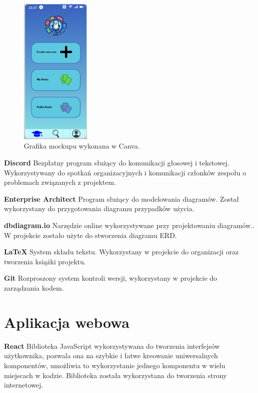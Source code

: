 \begin{figure}[H]
    \centering
    \includegraphics[width=0.3\textwidth]{chapters/chapter_7/canva}
    \caption{Grafika mockupu wykonana w Canva.}
    \label{img:canva}
\end{figure}


\textbf{Discord} Bezpłatny program służący do komunikacji głosowej i tekstowej. Wykorzystywany do spotkań organizacyjnych i komunikacji członków zespołu o problemach związanych z projektem.

\medskip

\textbf{Enterprise Architect} Program służący do modelowania diagramów. Został wykorzystany do przygotowania diagramu przypadków użycia.

\medskip

\textbf{dbdiagram.io} Narzędzie online wykorzystywane przy projektowaniu diagramów.. W projekcie zostało użyte do stworzenia diagramu ERD.

\medskip

\textbf{LaTeX} System składu tekstu. Wykorzystany w projekcie do organizacji oraz tworzenia książki projektu.

\medskip

\textbf{Git} Rozproszony system kontroli wersji, wykorzystany w projekcie do zarządzania kodem.

\section{Aplikacja webowa}

\textbf{React} Biblioteka JavaScript wykorzystywana do tworzenia interfejsów użytkownika, pozwala ona na szybkie i łatwe kreowanie uniwersalnych komponentów, umożliwia to wykorzystanie jednego komponentu w wielu miejscach w kodzie. Biblioteka została wykorzystana do tworzenia strony internetowej.

